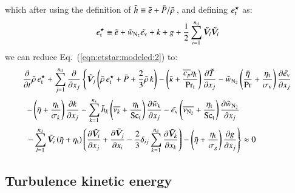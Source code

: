 \documentclass{warpdoc}
\newcommand{\alb}{\vspace{0.2cm}\\} %
\newcommand{\Cp}{{c_{p}}}
\newcommand{\Sct}{{{\rm Sc}_{\rm t}}}
\newcommand{\Prt}{{{\rm Pr}_{\rm t}}}
\newcommand{\nd}{{{n}_{\rm d}}}
\newcommand{\ns}{{{n}_{\rm s}}}
\newcommand{\turb}{_{\rm t}}
\newcommand{\etat}{{\eta\turb}}
\newcommand{\mfd}{\displaystyle}
\newcommand{\ev}{e_{\rm v}}
\newcommand{\sigmav}{\sigma_{\rm v}}
\newcommand{\etstar}{{e_{\rm t}^\star}}
\begin{document}
%
which after using the definition of $\tilde{h}\equiv \tilde{e}+\bar{P}/\bar{\rho}\,$, and
defining $\etstar$ as:
%
\begin{equation}
  \etstar  \equiv  \wtilde{e}+{\wtilde{w}_{\rm N_2}}\wtilde{\ev}+ k+g+\frac{1}{2}\sum_{i=1}^{\nd}  {\wtilde{\bm{V}}_i}  {\wtilde{\bm{V}}_i}
 \label{eqn:etstar}
\end{equation}
%
we can reduce Eq.\ (\ref{eqn:etstar:modeled:2}) to:
%
\begin{equation}
 \begin{array}{l}
    \mfd\frac{\partial}{\partial t}  \wbar{\rho}\, \etstar
     + \sum_{j=1}^{\nd} \frac{\partial}{\partial x_j} \left\{ {\wtilde{\bm{V}}_j}
       \left(
            \wbar{\rho}\, \etstar
            +\wbar{P}
            +\frac{2}{3} \wbar{\rho}\, k
       \right) 
    -\left( \wbar{\kappa}+\frac{\overline{\Cp} \etat}{\Prt} \right)
       \frac{\partial \wtilde{T}}{\partial x_j}
    - {\wtilde{w}_{\rm N_2}} \left( \frac{\wbar{\eta}}{\Pr}+\frac{ \etat}{\sigmav} \right) \frac{\partial \wtilde{\ev}}{\partial x_j}\right.\alb\mfd~~   
-\left( \wbar{\eta}+\frac{\etat}{\sigma_k} \right) \frac{\partial k}{\partial x_j}
 -\sum_{k=1}^{\ns}
          {\wtilde{h}_k} 
            \left( \overline{\nu_k}+\frac{\etat}{\Sct} \right)
               \frac{\partial {\wtilde{w}_k}}{\partial x_j}
- \wtilde{\ev} \left( \overline{\nu_{\rm N_2} }+\frac{\etat}{\Sct} \right) \frac{\partial {\wtilde{w}_{\rm N_2}}}{\partial x_j}
       \alb~~
    \mfd \left. -\sum_{i=1}^{\nd}
         {\wtilde{\bm{V}}_i} 
            \left(\wbar{\eta}+\etat\right) \left(
               \frac{\partial {\wtilde{\bm{V}}_i}}{\partial x_j}
               +\frac{\partial {\wtilde{\bm{V}}_j}}{\partial x_i}
               -\frac{2}{3} \delta_{ij} \sum_{k=1}^\nd \frac{\partial {\wtilde{\bm{V}}_k}}{\partial x_k}
            \right)
        
    - \left( \wbar{\eta}+\frac{\etat}{\sigma_g} \right) \frac{\partial g}{\partial x_j}
      \right\}
      \approx 0
 \end{array}
 \label{eqn:etstar:modeled:final}
\end{equation}
%







\subsection{Turbulence kinetic energy}
\end{document}
